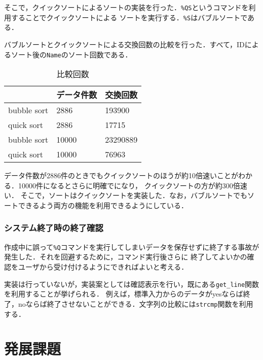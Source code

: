 \documentclass[a4j,11pt]{jarticle}
\begin{document}
そこで，クイックソートによるソートの実装を行った．\verb|%QS|というコマンドを利用することでクイックソートによる
ソートを実行する．\verb|%S|はバブルソートである．

バブルソートとクイックソートによる交換回数の比較を行った．すべて，IDによるソート後の\verb|Name|のソート回数である．
\begin{table}[t]
    \centering %
    \caption{比較回数}
\begin{tabular}{|l|l|l|}
\hline
            & データ件数 & 交換回数     \\ \hline
bubble sort & 2886  & 193900   \\ \hline
quick sort  & 2886  & 17715    \\ \hline
bubble sort & 10000 & 23290889 \\ \hline
quick sort  & 10000 & 76963    \\ \hline
\end{tabular}
\end{table}

データ件数が2886件のときでもクイックソートのほうが約10倍速いことがわかる．10000件になるとさらに明確でになり，
クイックソートの方が約300倍速い．
そこで，ソートはクイックソートを実装した．なお，バブルソートでもソートできるよう両方の機能を利用できるようにしている．
\subsubsection{システム終了時の終了確認}
作成中に誤って\verb|%Q|コマンドを実行してしまいデータを保存せずに終了する事故が発生した．それを回避するために，コマンド実行後さらに
終了してよいかの確認をユーザから受け付けるようにできればよいと考える．

実装は行っていないが，実装案としては確認表示を行い，既にある\verb|get_line|関数を利用することが挙げられる．
例えば，標準入力からのデータがyesならば終了，noならば終了させないことができる．文字列の比較には\verb|strcmp|関数を利用する．
\section{発展課題}\label{sec:hatten}
\end{document}
